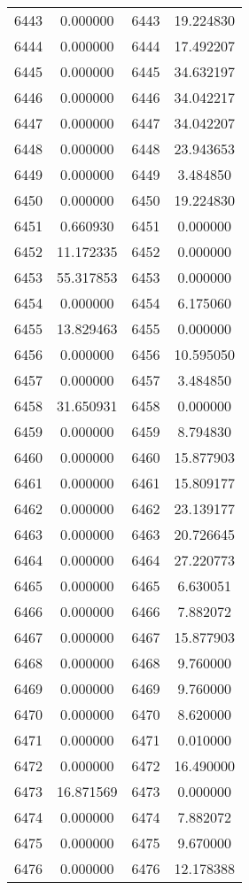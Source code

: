 \documentclass[12pt]{article}
\begin{document}
\begin{longtable}{@{}cccc@{}}
6443 & 0.000000 & 6443 & 19.224830 \\
6444 & 0.000000 & 6444 & 17.492207 \\
6445 & 0.000000 & 6445 & 34.632197 \\
6446 & 0.000000 & 6446 & 34.042217 \\
6447 & 0.000000 & 6447 & 34.042207 \\
6448 & 0.000000 & 6448 & 23.943653 \\
6449 & 0.000000 & 6449 & 3.484850 \\
6450 & 0.000000 & 6450 & 19.224830 \\
6451 & 0.660930 & 6451 & 0.000000 \\
6452 & 11.172335 & 6452 & 0.000000 \\
6453 & 55.317853 & 6453 & 0.000000 \\
6454 & 0.000000 & 6454 & 6.175060 \\
6455 & 13.829463 & 6455 & 0.000000 \\
6456 & 0.000000 & 6456 & 10.595050 \\
6457 & 0.000000 & 6457 & 3.484850 \\
6458 & 31.650931 & 6458 & 0.000000 \\
6459 & 0.000000 & 6459 & 8.794830 \\
6460 & 0.000000 & 6460 & 15.877903 \\
6461 & 0.000000 & 6461 & 15.809177 \\
6462 & 0.000000 & 6462 & 23.139177 \\
6463 & 0.000000 & 6463 & 20.726645 \\
6464 & 0.000000 & 6464 & 27.220773 \\
6465 & 0.000000 & 6465 & 6.630051 \\
6466 & 0.000000 & 6466 & 7.882072 \\
6467 & 0.000000 & 6467 & 15.877903 \\
6468 & 0.000000 & 6468 & 9.760000 \\
6469 & 0.000000 & 6469 & 9.760000 \\
6470 & 0.000000 & 6470 & 8.620000 \\
6471 & 0.000000 & 6471 & 0.010000 \\
6472 & 0.000000 & 6472 & 16.490000 \\
6473 & 16.871569 & 6473 & 0.000000 \\
6474 & 0.000000 & 6474 & 7.882072 \\
6475 & 0.000000 & 6475 & 9.670000 \\
6476 & 0.000000 & 6476 & 12.178388 \\

\end{longtable}
\end{document}
